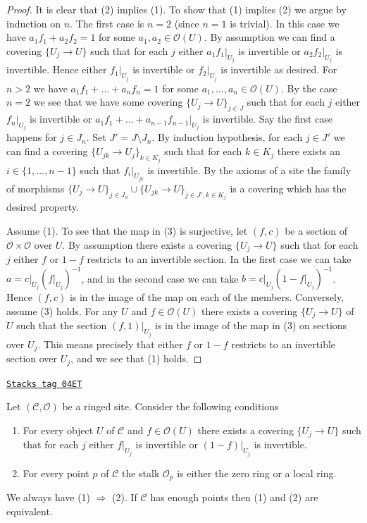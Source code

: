 \begin{proof}
It is clear that (2) implies (1). To show that (1) implies (2) we argue by
induction on $n$. The first case is $n = 2$ (since $n = 1$ is trivial).
In this case we have $a_1f_1 + a_2f_2 = 1$ for some
$a_1, a_2 \in \mathcal{O}(U)$. By assumption we can find a covering
$\{U_j \to U\}$ such that for each $j$
either $a_1f_1|_{U_j}$ is invertible or $a_2f_2|_{U_j}$ is invertible.
Hence either $f_1|_{U_j}$ is invertible or $f_2|_{U_j}$ is invertible
as desired. For $n > 2$ we have
$a_1f_1 + \ldots + a_nf_n = 1$ for some $a_1, \ldots, a_n \in \mathcal{O}(U)$.
By the case $n = 2$ we see that we have some covering $\{U_j \to U\}_{j \in J}$
such that for each $j$ either $f_n|_{U_j}$ is invertible or
$a_1f_1 + \ldots + a_{n - 1}f_{n - 1}|_{U_j}$ is invertible.
Say the first case happens for $j \in J_n$. Set $J' = J \setminus J_n$.
By induction hypothesis, for each $j \in J'$ we can find a covering
$\{U_{jk} \to U_j\}_{k \in K_j}$ such that for each $k \in K_j$ there
exists an $i \in \{1, \ldots, n - 1\}$ such that
$f_i|_{U_{jk}}$ is invertible. By the axioms of a site the family of
morphisms
$\{U_j \to U\}_{j \in J_n} \cup \{U_{jk} \to U\}_{j \in J', k \in K_j}$
is a covering which has the desired property.

\medskip\noindent
Assume (1). To see that the map in (3) is surjective, let
$(f, c)$ be a section of $\mathcal{O} \times \mathcal{O}$ over $U$.
By assumption there exists a covering $\{U_j \to U\}$ such that
for each $j$ either $f$ or $1 - f$ restricts to an invertible section.
In the first case we can take $a = c|_{U_j} (f|_{U_j})^{-1}$, and
in the second case we can take $b = c|_{U_j} (1 - f|_{U_j})^{-1}$.
Hence $(f, c)$ is in the image of the map on each of the members.
Conversely, assume (3) holds. For any $U$ and $f \in \mathcal{O}(U)$
there exists a covering $\{U_j \to U\}$ of $U$ such that the
section $(f, 1)|_{U_j}$ is in the image of the map in (3) on sections
over $U_j$. This means precisely that either $f$ or $1 - f$ restricts
to an invertible section over $U_j$, and we see that (1) holds.
\end{proof}

\begin{lemma}
\label{sites-modules-lemma-locally-ringed-stalk}
\href{https://stacks.math.columbia.edu/tag/04ET}{\texttt{Stacks tag 04ET}}

Let $(\mathcal{C}, \mathcal{O})$ be a ringed site.
Consider the following conditions
\begin{enumerate}
\item For every object $U$ of $\mathcal{C}$ and $f \in \mathcal{O}(U)$
there exists a covering $\{U_j \to U\}$ such that for each $j$
either $f|_{U_j}$ is invertible or $(1 - f)|_{U_j}$ is invertible.
\item For every point $p$ of $\mathcal{C}$ the stalk $\mathcal{O}_p$
is either the zero ring or a local ring.
\end{enumerate}
We always have (1) $\Rightarrow$ (2). If $\mathcal{C}$ has enough points
then (1) and (2) are equivalent.
\end{lemma}

